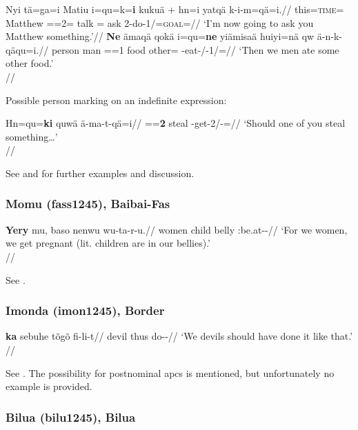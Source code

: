 \documentclass[A4paper]{article}
\begin{document}
\pex \label{ex:menyabpc}
\a \begingl
\gla Nyi tä=\ng{}ga=\ng{}i Matiu i=qu=k=\textbf{i} kuk\ng{}uä + hn=i yat\ng{}qä k-i-m=\ng{}qä=i.//
\Sg{} this=\textsc{time}=\Gvn{} Matthew \Dem=\M={2\Sg}=\Obj{} talk \Indf=\F{} ask 2\Sg-do-1\Sg/\Irr=\textsc{goal}=\Ind{}//
\glft `I'm now going to ask you Matthew something.'//
\endgl
\a\begingl
\gla \textbf{Ne} ämaqä qokä i=qu=\textbf{ne} yiämisa\ng{}ä huiyi=nä qw ä-n-k-qäqu=i.//
\Pl{} person man \Dem=\M={1\Pl} food other=\Foc{} \Cert{} \Ass-eat-\Pst/\Pfv{}-1\Pl/\Dso=\Ind{}//
\glft `Then we men ate some other food.'\\
\citep[30, (58/59)]{whitehead2006}//
\endgl
\xe

Possible person marking on an indefinite expression:

\ex \begingl
\gla Hn=qu=\textbf{ki} quwä ä-ma-t-qä=i//
\glb \Indf{}=\M=\textbf{2\Sg} steal \Ass-get-2\Sg/\Irr-\Generic=\Def{}//
\glft `Should one of you steal something\ldots'\\\citep[9, (18)]{whitehead2013}//
\endgl
\xe

See \citet[40, 46, 56f.]{whitehead2006} and \citet[9f., 18f.]{whitehead2013} for further examples and discussion.

\subsubsection{Momu (fass1245), Baibai-Fas}

\ex 
\begingl
\gla \textbf{Yery} mu, baso nenwu wu-ta-r-u.//
\Pl{} women child belly \Inan:be.at-\Pl\Sg{}-\Nmlz//
\glft `For we women, we get pregnant (lit. children are in our bellies).'\\\citep[568, (4)]{honeyman2016}//
\endgl
\xe

See \citet[169f., 242, 568]{honeyman2016}.

\subsubsection{Imonda (imon1245), Border}


\ex
\begingl
\gla \textbf{ka} sebuhe t\~{o}g\~{o} fi-li-t//
 devil thus do-\Emph-\Cf//
\glft `We devils should have done it like that.'\\\citep[61, (8)]{seiler1985}//
\endgl
\xe 

See \citet[44, 61f.]{seiler1985}. The possibility for postnominal \glspl{apc} is mentioned, but unfortunately no example is provided.

\subsubsection{Bilua (bilu1245), Bilua}
\end{document}
